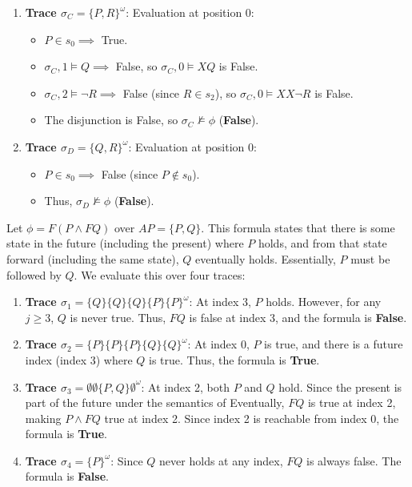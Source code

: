 \begin{example}
\begin{enumerate}
\begin{itemize}
              \item The disjunction is True, so $\sigma_B \models \phi$ is \textbf{True}.
          \end{itemize}
    \item \textbf{Trace $\sigma_C = \{P, R\}^\omega$}:
          Evaluation at position 0:
          \begin{itemize}
              \item $P \in s_0 \implies$ True.
              \item $\sigma_C, 1 \models Q \implies$ False, so $\sigma_C, 0 \models X Q$ is False.
              \item $\sigma_C, 2 \models \neg R \implies$ False (since $R \in s_2$), so $\sigma_C, 0 \models X X \neg R$ is False.
              \item The disjunction is False, so $\sigma_C \not\models \phi$ (\textbf{False}).
          \end{itemize}
    \item \textbf{Trace $\sigma_D = \{Q, R\}^\omega$}:
          Evaluation at position 0:
          \begin{itemize}
              \item $P \in s_0 \implies$ False (since $P \notin s_0$).
              \item Thus, $\sigma_D \not\models \phi$ (\textbf{False}).
          \end{itemize}
\end{enumerate}
\end{example}

\begin{example}
Let $\phi = F(P \land F Q)$ over $AP = \{P, Q\}$. This formula states that there is some state in the future (including the present) where $P$ holds, and from that state forward (including the same state), $Q$ eventually holds. Essentially, $P$ must be followed by $Q$.
We evaluate this over four traces:
\begin{enumerate}
    \item \textbf{Trace $\sigma_1 = \{Q\}\{Q\}\{Q\}\{P\}\{P\}^\omega$}:
          At index 3, $P$ holds. However, for any $j \ge 3$, $Q$ is never true. Thus, $F Q$ is false at index 3, and the formula is \textbf{False}.
    \item \textbf{Trace $\sigma_2 = \{P\}\{P\}\{P\}\{Q\}\{Q\}^\omega$}:
          At index 0, $P$ is true, and there is a future index (index 3) where $Q$ is true. Thus, the formula is \textbf{True}.
    \item \textbf{Trace $\sigma_3 = \emptyset \emptyset \{P, Q\} \emptyset^\omega$}:
          At index 2, both $P$ and $Q$ hold. Since the present is part of the future under the semantics of Eventually, $F Q$ is true at index 2, making $P \land F Q$ true at index 2. Since index 2 is reachable from index 0, the formula is \textbf{True}.
    \item \textbf{Trace $\sigma_4 = \{P\}^\omega$}:
          Since $Q$ never holds at any index, $F Q$ is always false. The formula is \textbf{False}.
\end{enumerate}
\end{example}

